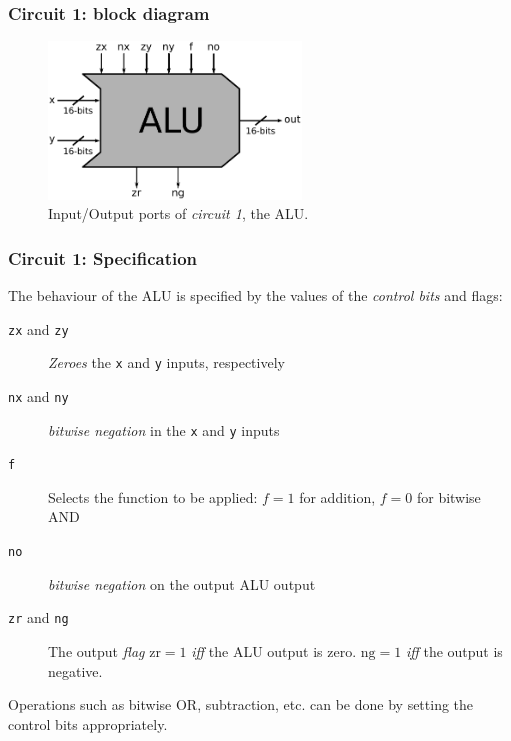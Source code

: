 \documentclass{beamer}
\begin{document}
            \begin{frame}
                \frametitle{Circuit 1: block diagram}

                \begin{figure}[h!]
                    \centerline{\includegraphics[width=0.6\textwidth]{imgs/alu-block.pdf}}
                    \caption{Input/Output ports of \emph{circuit 1}, the ALU.
                        \label{fig:alu-block}}
                \end{figure}
            \end{frame}

            \begin{frame}
                \frametitle{Circuit 1: Specification}

                \par{The behaviour of the ALU is specified by the values of the \emph{control bits} and flags:}

                \begin{description}
                    \item[\texttt{zx} and \texttt{zy}]
                        \emph{Zeroes} the \texttt{x} and \texttt{y} inputs, respectively
                    \item[\texttt{nx} and \texttt{ny}]
                        \emph{bitwise negation} in the \texttt{x} and \texttt{y} inputs
                    \item[\texttt{f}]
                        Selects the function to be applied: \newline
                        $f = 1$ for addition, $f = 0$ for bitwise AND
                    \item[\texttt{no}]
                        \emph{bitwise negation} on the output ALU output
                    \item[\texttt{zr} and \texttt{ng}]
                        The output \emph{flag} $\text{zr} = 1$ \emph{iff} the ALU output is zero.
                        $\text{ng} = 1$ \emph{iff} the output is negative.
                \end{description}

                \par{Operations such as bitwise OR, subtraction, etc. can be done by setting the control bits appropriately.}
            \end{frame}
\end{document}
